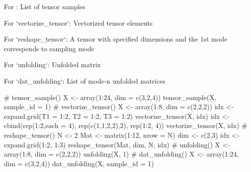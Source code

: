 \documentclass[a4paper]{book}
\begin{document}
%
\begin{Value}
For : List of tensor samples

For `vectorize\_tensor`: Vectorized tensor elements

For `reshape\_tensor`: A tensor with specified dimensions and the 1st mode corresponds to sampling mode

For `unfolding`: Unfolded matrix

For `dat\_unfolding`: List of mode-n unfolded matrices
\end{Value}
%
\begin{Examples}
\begin{ExampleCode}
# tensor_sample()
X <- array(1:24, dim = c(3,2,4))
tensor_sample(X, sample_id = 1)
# vectorize_tensor()
X <- array(1:8, dim = c(2,2,2))
idx <- expand.grid(T1 = 1:2, T2 = 1:2, T3 = 1:2)
vectorize_tensor(X, idx)
idx <- cbind(rep(1:2,each = 4), rep(c(1,1,2,2),2), rep(1:2, 4))
vectorize_tensor(X, idx)
# reshape_tensor()
N <- 2
Mat <- matrix(1:12, nrow = N)
dim <- c(2,3)
idx <- expand.grid(1:2, 1:3)
reshape_tensor(Mat, dim, N, idx)
# unfolding()
X <- array(1:8, dim = c(2,2,2))
unfolding(X, 1)
# dat_unfolding()
X <- array(1:24, dim = c(3,2,4))
dat_unfolding(X, sample_id = 1)
\end{ExampleCode}
\end{Examples}
\printindex{}
\end{document}
